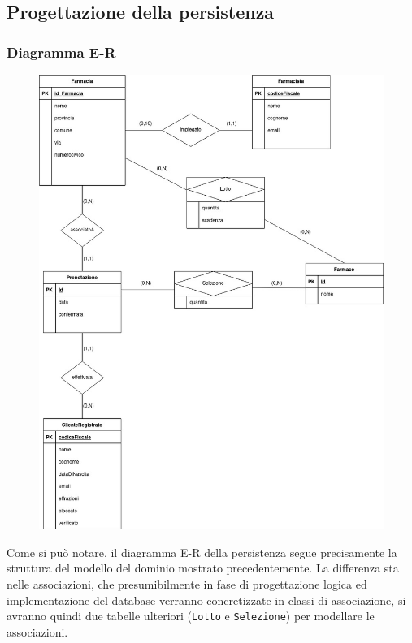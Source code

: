 \newpage

\subsection{Progettazione della persistenza}

\subsubsection*{Diagramma E-R}

\begin{figure}[h!]
    \begin{center}
        \includegraphics[scale=0.545]{immagini/DiagrammaE-R.jpg}
    \end{center}
\end{figure}

Come si può notare, il diagramma E-R della persistenza segue precisamente la struttura del modello del dominio mostrato precedentemente.
La differenza sta nelle associazioni, che presumibilmente in fase di progettazione logica ed implementazione del database verranno concretizzate in classi di associazione,
si avranno quindi due tabelle ulteriori (\texttt{Lotto} e \texttt{Selezione}) per modellare le associazioni.

